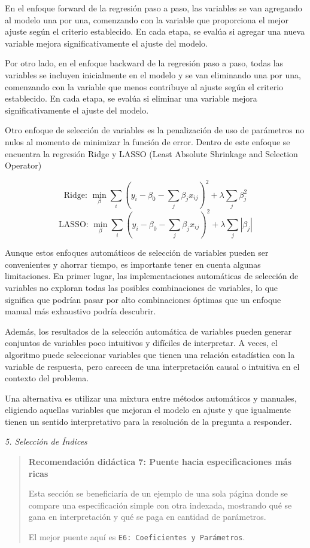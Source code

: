 \documentclass[
]{book}
\begin{document}
En el enfoque forward de la regresión paso a paso, las variables se van
agregando al modelo una por una, comenzando con la variable que
proporciona el mejor ajuste según el criterio establecido. En cada
etapa, se evalúa si agregar una nueva variable mejora significativamente
el ajuste del modelo.

Por otro lado, en el enfoque backward de la regresión paso a paso, todas
las variables se incluyen inicialmente en el modelo y se van eliminando
una por una, comenzando con la variable que menos contribuye al ajuste
según el criterio establecido. En cada etapa, se evalúa si eliminar una
variable mejora significativamente el ajuste del modelo.

Otro enfoque de selección de variables es la penalización de uso de
parámetros no nulos al momento de minimizar la función de error. Dentro
de este enfoque se encuentra la regresión Ridge y LASSO (Least Absolute
Shrinkage and Selection Operator)

\[\text{Ridge: }\min_{β} \sum_{i}(y_i - \beta_0 - \sum_{j}\beta_{j}x_{ij})^2 + λ\sum_{j}\beta_{j}^2\]
\[\text{LASSO: }\min_{β}\sum_{i}(y_i - \beta_0 - \sum_{j}\beta_{j}x_{ij})^2 + λ\sum_{j}|\beta_{j}|\]

Aunque estos enfoques automáticos de selección de variables pueden ser
convenientes y ahorrar tiempo, es importante tener en cuenta algunas
limitaciones. En primer lugar, las implementaciones automáticas de
selección de variables no exploran todas las posibles combinaciones de
variables, lo que significa que podrían pasar por alto combinaciones
óptimas que un enfoque manual más exhaustivo podría descubrir.

Además, los resultados de la selección automática de variables pueden
generar conjuntos de variables poco intuitivos y difíciles de
interpretar. A veces, el algoritmo puede seleccionar variables que
tienen una relación estadística con la variable de respuesta, pero
carecen de una interpretación causal o intuitiva en el contexto del
problema.

Una alternativa es utilizar una mixtura entre métodos automáticos y
manuales, eligiendo aquellas variables que mejoran el modelo en ajuste y
que igualmente tienen un sentido interpretativo para la resolución de la
pregunta a responder.

\emph{5. Selección de Índices}

\begin{quote}
\textbf{Recomendación didáctica 7: Puente hacia especificaciones más ricas}

Esta sección se beneficiaría de un ejemplo de una sola página donde se
compare una especificación simple con otra indexada, mostrando qué se
gana en interpretación y qué se paga en cantidad de parámetros.

El mejor puente aquí es \texttt{E6:\ Coeficientes\ y\ Parámetros}.
\end{quote}
\end{document}

